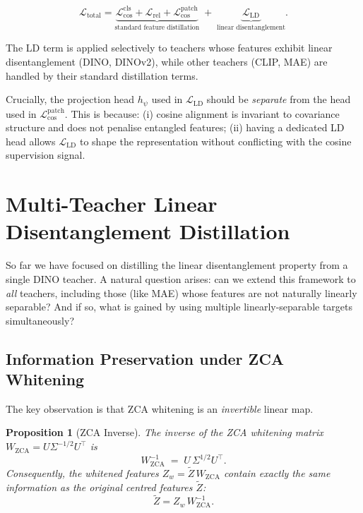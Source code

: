 \documentclass[11pt,a4paper]{article}
\newtheorem{proposition}[theorem]{Proposition}
\newcommand{\calL}{\mathcal{L}}
\begin{document}
\begin{equation}
    \calL_{\mathrm{total}}
    = \underbrace{\calL_{\cos}^{\mathrm{cls}} + \calL_{\mathrm{rel}} + \calL_{\cos}^{\mathrm{patch}}}_{\text{standard feature distillation}}
    \;+\; \underbrace{\calL_{\mathrm{LD}}}_{\text{linear disentanglement}}.
\label{eq:total}
\end{equation}

The LD term is applied selectively to teachers whose features exhibit linear
disentanglement (DINO, DINOv2), while other teachers (CLIP, MAE) are handled by
their standard distillation terms.

Crucially, the projection head $h_\psi$ used in $\calL_{\mathrm{LD}}$ should be
\emph{separate} from the head used in $\calL_{\cos}^{\mathrm{patch}}$.  This is
because:
(i) cosine alignment is invariant to covariance structure and does not penalise
    entangled features;
(ii) having a dedicated LD head allows $\calL_{\mathrm{LD}}$ to shape the
    representation without conflicting with the cosine supervision signal.

\section{Multi-Teacher Linear Disentanglement Distillation}
\label{sec:multi_teacher}

So far we have focused on distilling the linear disentanglement property from a
single DINO teacher.  A natural question arises: can we extend this framework
to \emph{all} teachers, including those (like MAE) whose features are not
naturally linearly separable?  And if so, what is gained by using multiple
linearly-separable targets simultaneously?

\subsection{Information Preservation under ZCA Whitening}
\label{sec:invertibility}

The key observation is that ZCA whitening is an \emph{invertible} linear map.

\begin{proposition}[ZCA Inverse]
\label{prop:zca_inverse}
The inverse of the ZCA whitening matrix
$W_{\mathrm{ZCA}} = U\Sigma^{-1/2}U^\top$ is
\[
    W_{\mathrm{ZCA}}^{-1} \;=\; U\,\Sigma^{1/2} U^\top.
\]
Consequently, the whitened features $Z_w = \tilde{Z}\,W_{\mathrm{ZCA}}$
contain exactly the same information as the original centred features $\tilde{Z}$:
\[
    \tilde{Z} = Z_w\, W_{\mathrm{ZCA}}^{-1}.
\]
\end{proposition}
\end{document}
